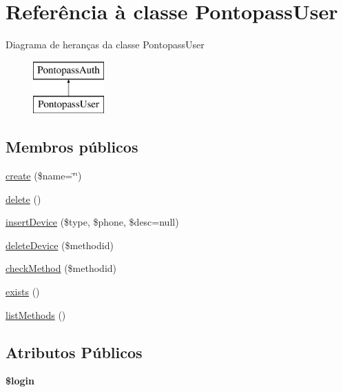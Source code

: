 \hypertarget{classPontopassUser}{\section{Referência à classe Pontopass\-User}
\label{classPontopassUser}
}
Diagrama de heranças da classe Pontopass\-User\begin{figure}[H]
\begin{center}
\leavevmode
\includegraphics[height=2.000000cm]{classPontopassUser}
\end{center}
\end{figure}
\subsection*{Membros públicos}
\begin{DoxyCompactItemize}
\item 
\hyperlink{classPontopassUser_ac357568a924218947ad8d56608ebd54a}{create} (\$name=\char`\"{}\char`\"{})
\item 
\hyperlink{classPontopassUser_aa07fc177a4efec331e7919ad847b2a02}{delete} ()
\item 
\hyperlink{classPontopassUser_afae4d293eefebe500c3f6937755cb1db}{insert\-Device} (\$type, \$phone, \$desc=null)
\item 
\hyperlink{classPontopassUser_aa801f31c2272a106c99cae5e8d95560e}{delete\-Device} (\$methodid)
\item 
\hyperlink{classPontopassUser_a354d501dc79433784c236dbf46c6641a}{check\-Method} (\$methodid)
\item 
\hyperlink{classPontopassUser_a054a98aa1525a632f5ccffe3d2776e72}{exists} ()
\item 
\hyperlink{classPontopassUser_af9b7615674b739effeff9c9eca361939}{list\-Methods} ()
\end{DoxyCompactItemize}
\subsection*{Atributos Públicos}
\begin{DoxyCompactItemize}
\item 
\hypertarget{classPontopassUser_a396a17b0b901b42078dd38c5fecde6e6}{{\bfseries \$login}}\label{classPontopassUser_a396a17b0b901b42078dd38c5fecde6e6}

\end{DoxyCompactItemize}
